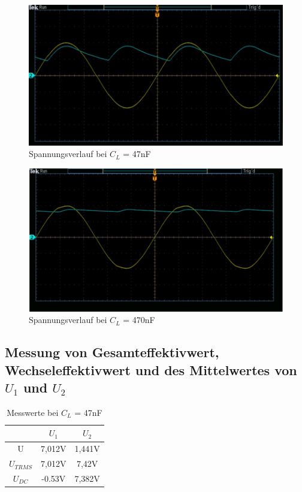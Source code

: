 \documentclass{article}
\begin{document}
\begin{figure}[h]
  \begin{center}
    \includegraphics[scale=0.7]{../assets/images/EL1P2/aufgabe 4 47n.JPG}
    \caption{Spannungsverlauf bei $C_L$ = 47nF}
  \end{center}
\end{figure}

\begin{figure}[h]
  \begin{center}
    \includegraphics[scale=0.6]{../assets/images/EL1P2/aufgabe 4 470n.JPG}
    \caption{Spannungsverlauf bei $C_L$ = 470nF}
  \end{center}
\end{figure} 

\newpage

\subsection{Messung von Gesamteffektivwert, Wechseleffektivwert und des Mittelwertes von $U_1$ und $U_2$}

\begin{table}[h]
  \begin{center}
\begin{tabular}{|c|c|c|}
  \hline
  & $U_{1}$ & $U_{2}$  \\
  \hline
  U\raisebox{-0.9ex}{\~{}} & 7,012V & 1,441V\\
  \hline
  $U_{TRMS}$ & 7,012V&7,42V\\
  \hline
  $U_{DC}$ & -0.53V&7,382V\\
  \hline
\end{tabular}
\caption{Messwerte bei $C_L$ = 47nF}
\end{center}
\end{table}
\end{document}
